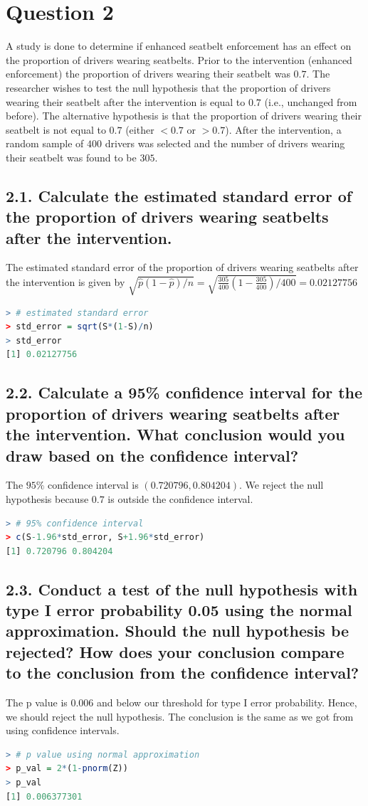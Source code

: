 \documentclass[11pt]{article}
\begin{document}
\section*{Question 2}
A study is done to determine if enhanced seatbelt enforcement has an effect on the proportion of drivers wearing seatbelts. Prior to the intervention (enhanced enforcement) the proportion of drivers wearing their seatbelt was $0.7$. The researcher wishes to test the null hypothesis that the proportion of drivers wearing their seatbelt after the intervention is equal to $0.7$ (i.e., unchanged from before). The alternative hypothesis is that the proportion of drivers wearing their seatbelt is not equal to $0.7$ (either $< 0.7$ or $> 0.7$). After the intervention, a random sample of $400$ drivers was selected and the number of drivers wearing their seatbelt was found to be $305$.

\subsection*{2.1. Calculate the estimated standard error of the proportion of drivers wearing seatbelts after the intervention.}
The estimated standard error of the proportion of drivers wearing seatbelts after the intervention is given by $\sqrt{\hat{p}(1-\hat{p})/n} = \sqrt{\frac{305}{400}(1-\frac{305}{400})/400} = 0.02127756$
\begin{lstlisting}[language=R]
> # estimated standard error
> std_error = sqrt(S*(1-S)/n)
> std_error
[1] 0.02127756
\end{lstlisting}

\subsection*{2.2. Calculate a 95\% confidence interval for the proportion of drivers wearing seatbelts after the intervention. What conclusion would you draw based on the confidence interval?}
The $95\%$ confidence interval is $(0.720796, 0.804204)$. We reject the null hypothesis because $0.7$ is outside the confidence interval. 
\begin{lstlisting}[language=R]
> # 95% confidence interval
> c(S-1.96*std_error, S+1.96*std_error)
[1] 0.720796 0.804204
\end{lstlisting}


\subsection*{2.3. Conduct a test of the null hypothesis with type I error probability 0.05 using the normal approximation. Should the null hypothesis be rejected? How does your conclusion compare to the conclusion from the confidence interval?}
The p value is 0.006 and below our threshold for type I error probability. Hence, we should reject the null hypothesis. The conclusion is the same as we got from using confidence intervals.
\begin{lstlisting}[language=R]
> # p value using normal approximation
> p_val = 2*(1-pnorm(Z))
> p_val
[1] 0.006377301
\end{lstlisting}
\end{document}
